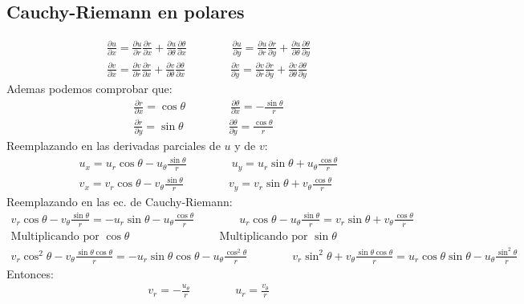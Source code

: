 \documentclass{article}
\begin{document}
\subsection{Cauchy-Riemann en polares }
\begin{gather*}
  \frac{\partial u  }{\partial x } =  \frac{\partial u  }{\partial  r } \frac{\partial r  }{\partial x } + \frac{\partial u  }{\partial \theta } \frac{\partial \theta  }{\partial x }\qquad \qquad
  \frac{\partial u  }{\partial y } = \frac{\partial u  }{\partial r } \frac{\partial r  }{\partial y } + \frac{\partial u  }{\partial \theta } \frac{\partial \theta  }{\partial y }\\
  \frac{\partial v  }{\partial  x } = \frac{\partial v  }{\partial r } \frac{\partial r  }{\partial x } + \frac{\partial v  }{\partial \theta }\frac{\partial \theta  }{\partial x }\qquad \qquad
  \frac{\partial v  }{\partial  y } = \frac{\partial v  }{\partial r }\frac{\partial r  }{\partial y}  + \frac{\partial v  }{\partial  \theta } \frac{\partial \theta  }{\partial  y }
\end{gather*}
Ademas podemos comprobar que: 
\begin{gather*}
  \frac{\partial r  }{\partial x } = \cos{\theta} \qquad \qquad \frac{\partial \theta  }{\partial x } = - \frac{\sin{\theta }}{r } \\
  \frac{\partial r  }{\partial y} = \sin{\theta} \qquad \qquad \frac{\partial \theta  }{\partial y} = \frac{\cos{\theta}}{r}
\end{gather*}
Reemplazando en las derivadas parciales de $ u  $ y de $ v  $: 
\begin{gather*}
  u_x = u_r \cos{\theta} - u _\theta \frac{ \sin{\theta} }{ r } \qquad \qquad u_y = u_r \sin{\theta} + u_\theta  \frac{\cos{\theta}}{r }\\
  v_x = v_r \cos{\theta} - v_\theta \frac{\sin{\theta}}{r } \qquad \qquad v_y = v_r \sin{\theta} + v_\theta \frac{\cos{\theta}}{r}
\end{gather*}
Reemplazando en las ec. de Cauchy-Riemann: 
\begin{gather*}
  v_r \cos{\theta} - v_\theta \frac{\sin{\theta }}{r } =  -u_r \sin{\theta} - u _\theta \frac{\cos{\theta}}{r} \qquad \qquad u_r \cos{\theta} - u_\theta \frac{\sin{\theta}}{r } = v_r \sin{\theta} + v_\theta \frac{\cos{\theta}}{r }\\
  \text{Multiplicando por }\cos{\theta}\qquad \qquad \qquad \qquad \text{Multiplicando por }\sin{\theta}\\
  v_r \cos^2 \theta - v_\theta \frac{\sin{\theta}\cos{\theta}}{r } = - u_r \sin{\theta} \cos{\theta} - u_\theta \frac{\cos^2 \theta }{r } \qquad \qquad 
  v_r \sin^2 {\theta} + v_\theta \frac{\sin{\theta}\cos{\theta}}{r } = u_r \cos{\theta} \sin{\theta} - u_\theta \frac{\sin^2{\theta }}{r }
\end{gather*}
Entonces: 
\begin{gather*}
  v_r = - \frac{u_\theta }{r } \qquad \qquad u_r = \frac{v_\theta }{r} 
\end{gather*}
\end{document}
